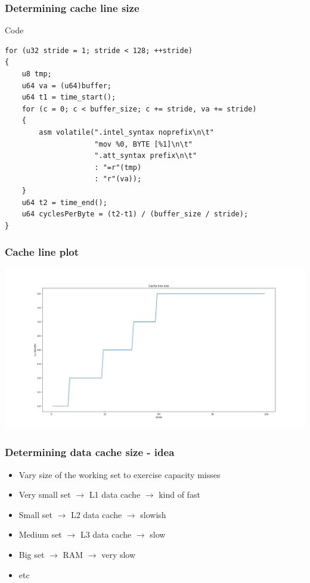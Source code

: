 \documentclass{beamer}
\begin{document}
\begin{frame}[fragile]
\frametitle{Determining cache line size}
\begin{block}{Code}
\begin{lstlisting}[style=code]
for (u32 stride = 1; stride < 128; ++stride)
{
    u8 tmp;
    u64 va = (u64)buffer;
    u64 t1 = time_start();
    for (c = 0; c < buffer_size; c += stride, va += stride)
    {
        asm volatile(".intel_syntax noprefix\n\t"
                     "mov %0, BYTE [%1]\n\t"
                     ".att_syntax prefix\n\t"
                     : "=r"(tmp)
                     : "r"(va));
    }
    u64 t2 = time_end();
    u64 cyclesPerByte = (t2-t1) / (buffer_size / stride);
}
\end{lstlisting}
\end{block}
\end{frame}

\begin{frame}
\frametitle{Cache line plot}
\includegraphics[scale=.24]{img/cache_line_size.png}
\end{frame}

\begin{frame}
\frametitle{Determining data cache size - idea}
\begin{itemize}
\item Vary size of the working set to exercise capacity misses
\item Very small set $\rightarrow$ L1 data cache $\rightarrow$ kind of fast
\item Small set $\rightarrow$ L2 data cache $\rightarrow$ slowish
\item Medium set $\rightarrow$ L3 data cache $\rightarrow$ slow
\item Big set $\rightarrow$ RAM $\rightarrow$ very slow
\item etc
\end{itemize}
\end{frame}
\end{document}
